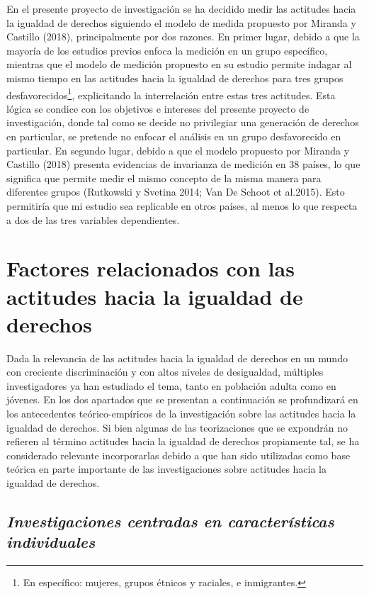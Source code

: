 \documentclass[12pt,twoside]{templates/facsothesis}
\begin{document}
En el presente proyecto de investigación se ha decidido medir las actitudes hacia la igualdad de derechos siguiendo el modelo de medida propuesto por Miranda y Castillo (2018), principalmente por dos razones. En primer lugar, debido a que la mayoría de los estudios previos enfoca la medición en un grupo específico, mientras que el modelo de medición propuesto en su estudio permite indagar al mismo tiempo en las actitudes hacia la igualdad de derechos para tres grupos desfavorecidos\footnote{En específico: mujeres, grupos étnicos y raciales, e inmigrantes.}, explicitando la interrelación entre estas tres actitudes. Esta lógica se condice con los objetivos e intereses del presente proyecto de investigación, donde tal como se decide no privilegiar una generación de derechos en particular, se pretende no enfocar el análisis en un grupo desfavorecido en particular. En segundo lugar, debido a que el modelo propuesto por Miranda y Castillo (2018) presenta evidencias de invarianza de medición en 38 países, lo que significa que permite medir el mismo concepto de la misma manera para diferentes grupos (Rutkowski y Svetina 2014; Van De Schoot et al.2015). Esto permitiría que mi estudio sea replicable en otros países, al menos lo que respecta a dos de las tres variables dependientes.

\hypertarget{factores-relacionados-con-las-actitudes-hacia-la-igualdad-de-derechos}{%
\section{Factores relacionados con las actitudes hacia la igualdad de derechos}\label{factores-relacionados-con-las-actitudes-hacia-la-igualdad-de-derechos}}

Dada la relevancia de las actitudes hacia la igualdad de derechos en un mundo con creciente discriminación y con altos niveles de desigualdad, múltiples investigadores ya han estudiado el tema, tanto en población adulta como en jóvenes. En los dos apartados que se presentan a continuación se profundizará en los antecedentes teórico-empíricos de la investigación sobre las actitudes hacia la igualdad de derechos. Si bien algunas de las teorizaciones que se expondrán no refieren al término actitudes hacia la igualdad de derechos propiamente tal, se ha considerado relevante incorporarlas debido a que han sido utilizadas como base teórica en parte importante de las investigaciones sobre actitudes hacia la igualdad de derechos.

\hypertarget{investigaciones-centradas-en-caracteruxedsticas-individuales}{%
\subsection{\texorpdfstring{\emph{Investigaciones centradas en características individuales}}{Investigaciones centradas en características individuales}}\label{investigaciones-centradas-en-caracteruxedsticas-individuales}}
\end{document}
